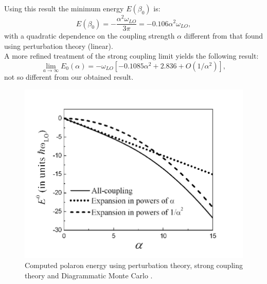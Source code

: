 \documentclass[12pt, a4paper]{report}
\numberwithin{equation}{section}
\begin{document}
Using this result the minimum energy $E(\beta_0)$ is:
\begin{equation}
    E(\beta_0)=-\frac{\alpha^2\omega_{LO}}{3\pi}=-0.106\alpha^2\omega_{LO},
\end{equation}
with a quadratic dependence on the coupling strength $\alpha$ different from that found using perturbation theory (linear).\\
A more refined treatment of the strong coupling limit \cite{miyake1976ground} yields the following result:
\begin{equation}
    \lim_{a\to\infty}E_0(\alpha)=-\omega_{LO}\left[-0.1085\alpha^2+2.836+O(1/\alpha^2)\right],
\end{equation}
not so different from our obtained result.
\begin{figure}[H]
    \centering
    \includegraphics[scale=1.0]{Feynman-polaron-energy-as-a-function-of-a-the-all-coupling-theory.png}
    \caption{Computed polaron energy using perturbation theory, strong coupling theory and Diagrammatic 
    Monte Carlo \cite{article_coupling}.}
    \label{fig:coupling_strength_Froehlich}
\end{figure}
\printbibliography
\end{document}
